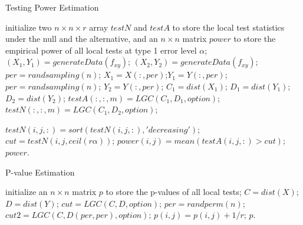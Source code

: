 \documentclass[11pt]{article}
\begin{document}
\begin{algorithm}
\caption{Testing Power Estimation}
\label{algPower}
\begin{algorithmic}
\State initialize two $n \times n \times r$ array $testN$ and $testA$ to store the local test statistics under the null and the alternative, and an $n \times n$ matrix $power$ to store the empirical power of all local tests at type 1 error level $\alpha$;
 
\State $(X_{1},Y_{1})=generateData(f_{xy})$; $(X_{2},Y_{2})=generateData(f_{xy})$; 
\Else
\State $per=randsampling(n)$; 
\State $X_{1}=X(:,per)$;$Y_{1}=Y(:,per)$; 
\State $per=randsampling(n)$; $Y_{2}=Y(:,per)$; 
\EndIf
\State $C_{1}=dist(X_{1})$; $D_{1}=dist(Y_{1})$; $D_{2}=dist(Y_{2})$;
\State $testA(:,:,m)=LGC(C_{1},D_{1},option)$; $testN(:,:,m)=LGC(C_{1},D_{2},option)$;
\EndFor

\State $testN(i,j,:)=sort(testN(i,j,:),'decreasing')$; 
\State $cut=testN(i,j,ceil(r\alpha))$; 
\State $power(i,j)=mean(testA(i,j,:)>cut)$; 
\EndFor
\EndFor
\State \Return $power$.
\EndFunction
\end{algorithmic}
\end{algorithm}

\begin{algorithm}
\caption{P-value Estimation}
\label{algPerm}
\begin{algorithmic}
\State initialize an $n \times n$ matrix $p$ to store the p-values of all local tests;
\State $C=dist(X)$; $D=dist(Y)$; 
\State $cut=LGC(C,D,option)$; 
\State $per=randperm(n)$; 
\State $cut2=LGC(C,D(per,per),option)$; 
\State $p(i,j)=p(i,j)+1/r$;
\EndIf
\EndFor
\EndFor
\EndFor
\State \Return $p$.
\EndFunction
\end{algorithmic}
\end{algorithm}
\end{document}
